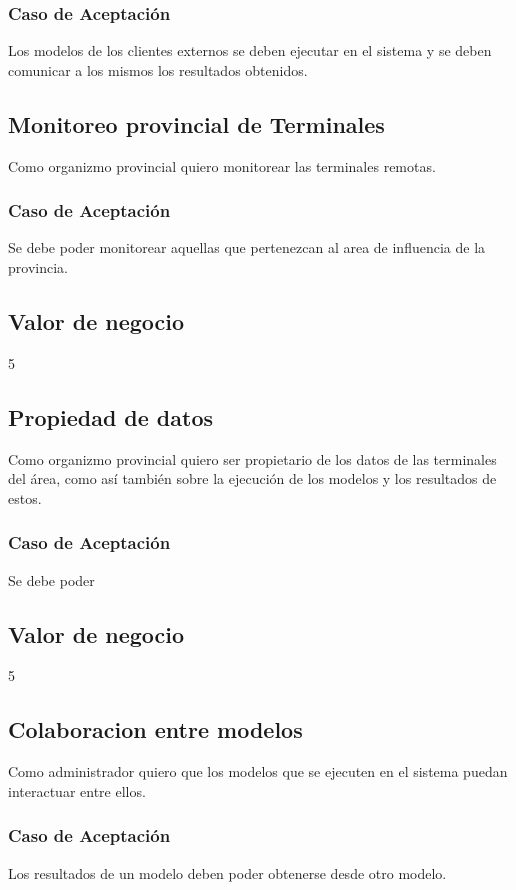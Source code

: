 \subsubsection*{Caso de Aceptación}
Los modelos de los clientes externos se deben ejecutar en el sistema y se deben comunicar a los mismos los resultados obtenidos.


\linea 
\subsection*{Monitoreo provincial de Terminales}
Como organizmo provincial quiero monitorear las terminales remotas.
\subsubsection*{Caso de Aceptación}
Se debe poder monitorear aquellas que pertenezcan al area de influencia de la provincia.
\subsection*{Valor de negocio}
5


\linea 
\subsection*{Propiedad de datos}
Como organizmo provincial quiero ser propietario de los datos de las terminales del área, como así también sobre la ejecución de los modelos y los resultados de estos.
\subsubsection*{Caso de Aceptación}
Se debe poder %
\subsection*{Valor de negocio}
5


\linea 
\subsection*{Colaboracion entre modelos}
Como administrador quiero que los modelos que se ejecuten en el sistema puedan interactuar entre ellos.
\subsubsection*{Caso de Aceptación}
Los resultados de un modelo deben poder obtenerse desde otro modelo.
